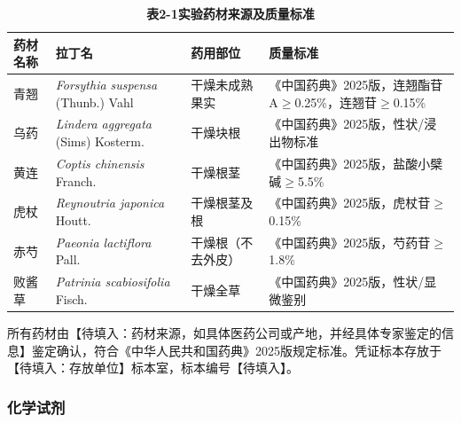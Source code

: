 \documentclass[12pt,a4paper,UTF8,openany]{ctexbook}
\begin{document}
\begin{table}[H]
\centering
\caption{\textbf{表2-1\enspace 实验药材来源及质量标准}}
\label{tab:herb_materials}
\small
\begin{tabularx}{\textwidth}{>{\raggedright\arraybackslash}p{1.8cm} >{\raggedright\arraybackslash}p{3.5cm} >{\centering\arraybackslash}p{1.5cm} >{\raggedright\arraybackslash}X}
\toprule
\textbf{药材名称} & \textbf{拉丁名} & \textbf{药用部位} & \textbf{质量标准} \\
\midrule
青翘 & \textit{Forsythia suspensa} (Thunb.) Vahl & 干燥未成熟果实 & 《中国药典》2025版，连翘酯苷A$\geq$0.25\%，连翘苷$\geq$0.15\% \\
\addlinespace
乌药 & \textit{Lindera aggregata} (Sims) Kosterm. & 干燥块根 & 《中国药典》2025版，性状/浸出物标准 \\
\addlinespace
黄连 & \textit{Coptis chinensis} Franch. & 干燥根茎 & 《中国药典》2025版，盐酸小檗碱$\geq$5.5\% \\
\addlinespace
虎杖 & \textit{Reynoutria japonica} Houtt. & 干燥根茎及根 & 《中国药典》2025版，虎杖苷$\geq$0.15\% \\
\addlinespace
赤芍 & \textit{Paeonia lactiflora} Pall. & 干燥根（不去外皮）& 《中国药典》2025版，芍药苷$\geq$1.8\% \\
\addlinespace
败酱草 & \textit{Patrinia scabiosifolia} Fisch. & 干燥全草 & 《中国药典》2025版，性状/显微鉴别 \\
\bottomrule
\end{tabularx}
\end{table}

所有药材由【待填入：药材来源，如具体医药公司或产地，并经具体专家鉴定的信息】鉴定确认，符合《中华人民共和国药典》2025版规定标准。凭证标本存放于【待填入：存放单位】标本室，标本编号【待填入】。

\subsubsection{化学试剂}
\end{document}
